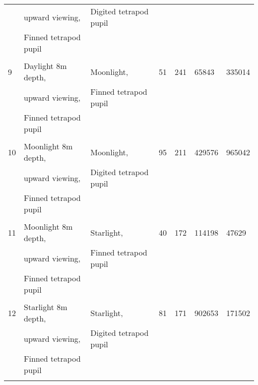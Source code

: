 \begin{tabular}{lllllll}
&upward viewing,&Digited tetrapod pupil&&&&\\\
&Finned tetrapod pupil&&&&&\\\\\hline
9&Daylight 8m depth,&Moonlight,&51&241&65843&335014\\\
&upward viewing,&Finned tetrapod pupil&&&&\\\
&Finned tetrapod pupil&&&&&\\\\\hline
10&Moonlight 8m depth,&Moonlight,&95&211&429576&965042\\\
&upward viewing,&Digited tetrapod pupil&&&&\\\
&Finned tetrapod pupil&&&&&\\\\\hline
11&Moonlight 8m depth,&Starlight,&40&172&114198&47629\\\
&upward viewing,&Finned tetrapod pupil&&&&\\\
&Finned tetrapod pupil&&&&&\\\\\hline
12&Starlight 8m depth,&Starlight,&81&171&902653&171502\\\
&upward viewing,&Digited tetrapod pupil&&&&\\\
&Finned tetrapod pupil&&&&&\\\\\hline
\bottomrule
\end{tabular}
